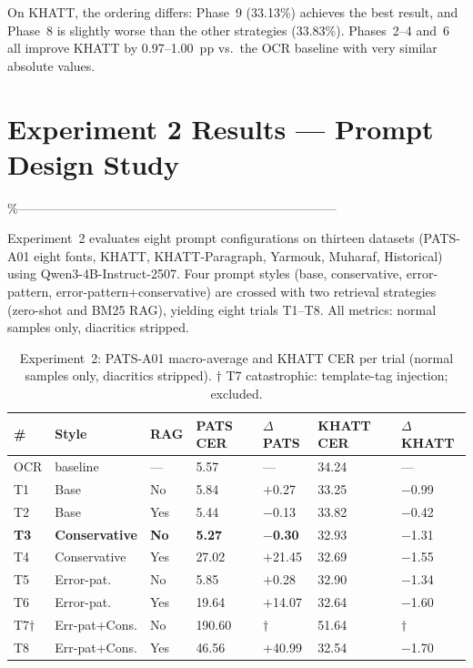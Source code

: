 On KHATT, the ordering differs: Phase~9 (33.13\%) achieves the best result,
and Phase~8 is slightly worse than the other strategies (33.83\%). Phases~2--4
and~6 all improve KHATT by 0.97--1.00~pp vs.\ the OCR baseline with very
similar absolute values.

\section{Experiment 2 Results --- Prompt Design Study}
\label{sec:res_exp2}
\%---------------------------------------------------------------------------

Experiment~2 evaluates eight prompt configurations on thirteen datasets
(PATS-A01 eight fonts, KHATT, KHATT-Paragraph, Yarmouk, Muharaf, Historical)
using Qwen3-4B-Instruct-2507. Four prompt styles (base, conservative,
error-pattern, error-pattern+conservative) are crossed with two retrieval
strategies (zero-shot and BM25 RAG), yielding eight trials T1--T8.
All metrics: normal samples only, diacritics stripped.

\begin{table}[htbp]
  \centering
  \caption{Experiment~2: PATS-A01 macro-average and KHATT CER per trial
           (normal samples only, diacritics stripped).
           $\dagger$ T7 catastrophic: template-tag injection; excluded.}
  \label{tab:exp2_results}
  \begin{tabularx}{\textwidth}{lllXXXX}
    \toprule
    \textbf{\#} & \textbf{Style} & \textbf{RAG}
      & \textbf{PATS CER} & \textbf{$\Delta$PATS}
      & \textbf{KHATT CER} & \textbf{$\Delta$KHATT} \\
    \midrule
    OCR & baseline      & ---  &  5.57 & ---    & 34.24 & --- \\
    T1  & Base          & No   &  5.84 & $+$0.27 & 33.25 & $-$0.99 \\
    T2  & Base          & Yes  &  5.44 & $-$0.13 & 33.82 & $-$0.42 \\
    \textbf{T3}  & \textbf{Conservative} & \textbf{No} & \textbf{5.27} & \textbf{$-$0.30} & 32.93 & $-$1.31 \\
    T4  & Conservative  & Yes  & 27.02 & $+$21.45 & 32.69 & $-$1.55 \\
    T5  & Error-pat.    & No   &  5.85 & $+$0.28 & 32.90 & $-$1.34 \\
    T6  & Error-pat.    & Yes  & 19.64 & $+$14.07 & 32.64 & $-$1.60 \\
    T7$\dagger$ & Err-pat+Cons. & No & 190.60 & $\dagger$ & 51.64 & $\dagger$ \\
    T8  & Err-pat+Cons. & Yes  & 46.56 & $+$40.99 & 32.54 & $-$1.70 \\
    \bottomrule
  \end{tabularx}
\end{table}

